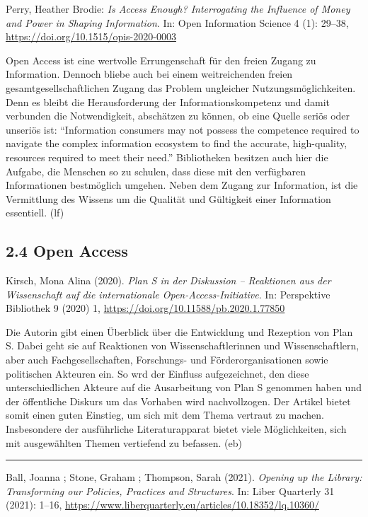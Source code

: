 \documentclass[a4paper,
fontsize=11pt,
oneside,
numbers=noperiodatend,
parskip=half-,
bibliography=totoc,
final
]{scrartcl}
\begin{document}
Perry, Heather Brodie: \emph{Is Access Enough? Interrogating the
Influence of Money and Power in Shaping Information}. In: Open
Information Science 4 (1): 29--38,
\url{https://doi.org/10.1515/opis-2020-0003}

Open Access ist eine wertvolle Errungenschaft für den freien Zugang zu
Information. Dennoch bliebe auch bei einem weitreichenden freien
gesamtgesellschaftlichen Zugang das Problem ungleicher
Nutzungsmöglichkeiten. Denn es bleibt die Herausforderung der
Informationskompetenz und damit verbunden die Notwendigkeit, abschätzen
zu können, ob eine Quelle seriös oder unseriös ist: \enquote{Information
consumers may not possess the competence required to navigate the
complex information ecosystem to find the accurate, high-quality,
resources required to meet their need.} Bibliotheken besitzen auch hier
die Aufgabe, die Menschen so zu schulen, dass diese mit den verfügbaren
Informationen bestmöglich umgehen. Neben dem Zugang zur Information, ist
die Vermittlung des Wissens um die Qualität und Gültigkeit einer
Information essentiell. (lf)

\hypertarget{open-access}{%
\subsection{2.4 Open Access}\label{open-access}}

Kirsch, Mona Alina (2020). \emph{Plan S in der Diskussion -- Reaktionen
aus der Wissenschaft auf die internationale Open-Access-Initiative}. In:
Perspektive Bibliothek 9 (2020) 1,
\url{https://doi.org/10.11588/pb.2020.1.77850}

Die Autorin gibt einen Überblick über die Entwicklung und Rezeption von
Plan S. Dabei geht sie auf Reaktionen von Wissenschaftlerinnen und
Wissenschaftlern, aber auch Fachgesellschaften, Forschungs- und
Förderorganisationen sowie politischen Akteuren ein. So wrd der Einfluss
aufgezeichnet, den diese unterschiedlichen Akteure auf die Ausarbeitung
von Plan S genommen haben und der öffentliche Diskurs um das Vorhaben
wird nachvollzogen. Der Artikel bietet somit einen guten Einstieg, um
sich mit dem Thema vertraut zu machen. Insbesondere der ausführliche
Literaturapparat bietet viele Möglichkeiten, sich mit ausgewählten
Themen vertiefend zu befassen. (eb)

\begin{center}\rule{0.5\linewidth}{0.5pt}\end{center}

Ball, Joanna ; Stone, Graham ; Thompson, Sarah (2021). \emph{Opening up
the Library: Transforming our Policies, Practices and Structures}. In:
Liber Quarterly 31 (2021): 1--16,
\url{https://www.liberquarterly.eu/articles/10.18352/lq.10360/}
\end{document}
